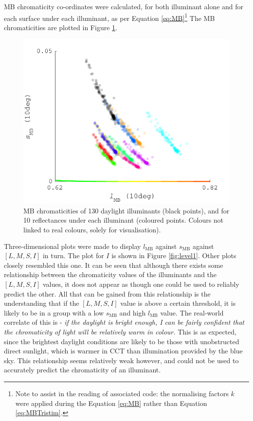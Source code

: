 \gls{MB} chromaticity co-ordinates were calculated, for both illuminant alone and for each surface under each illuminant, as per Equation \ref{eq:MB}\footnote{Note to assist in the reading of associated code: the normalising factors $k$ were applied during the Equation \ref{eq:MB} rather than Equation \ref{eq:MBTristim}.} The \gls{MB} chromaticities are plotted in Figure \ref{fig:MB}. 

\begin{figure}[htbp]
    \includegraphics[max width=\textwidth]{figs/comp/predictingChromaticity/BasicMB_2.pdf}
    \caption{\gls{MB} chromaticities of 130 daylight illuminants (black points), and for 10 reflectances under each illuminant (coloured points. Colours not linked to real colours, solely for visualisation).}
    \label{fig:MB}
\end{figure} 

Three-dimensional plots were made to display $l_{\text{MB}}$ against $s_{\text{MB}}$ against $[L,M,S,I]$ in turn. The plot for $I$ is shown in Figure \ref{fig:level1}. Other plots closely resembled this one. It can be seen that although there exists some relationship between the chromaticity values of the illuminants and the $[L,M,S,I]$ values, it does not appear as though one could be used to reliably predict the other. All that can be gained from this relationship is the understanding that if the $[L,M,S,I]$ value is above a certain threshold, it is likely to be in a group with a low $s_{\text{MB}}$ and high $l_{\text{MB}}$ value. The real-world correlate of this is - \textit{if the daylight is bright enough, I can be fairly confident that the chromaticity of light will be relatively warm in colour.} This is as expected, since the brightest daylight conditions are likely to be those with unobstructed direct sunlight, which is warmer in \gls{CCT} than illumination provided by the blue sky. This relationship seems relatively weak however, and could not be used to accurately predict the chromaticity of an illuminant. 

